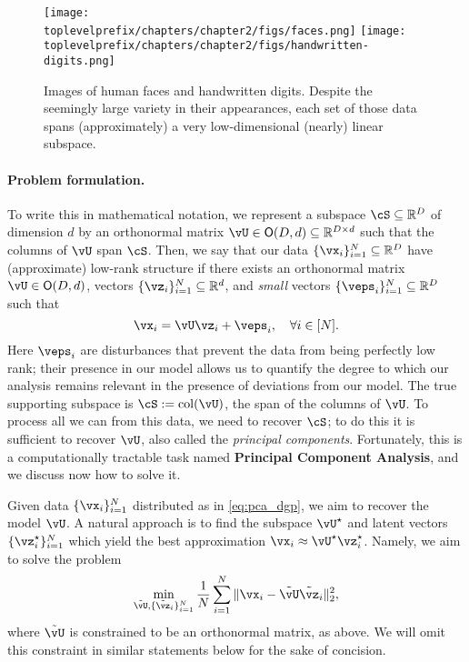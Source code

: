 \documentclass[\toplevelprefix/book-main.tex]{subfiles}
\begin{document}
\begin{figure}
    \centering
    \texttt{[image: \\toplevelprefix/chapters/chapter2/figs/faces.png]}
    \hspace{5mm} \texttt{[image: \\toplevelprefix/chapters/chapter2/figs/handwritten-digits.png]}   
    \caption{Images of human faces and handwritten digits. Despite the seemingly large variety in their appearances, each set of those data spans (approximately) a very low-dimensional (nearly) linear subspace.}
    \label{fig:faces-digits}
\end{figure}

\paragraph{Problem formulation.}
To write this in mathematical notation, we represent a subspace \(\cS \subseteq \R^{D}\) of dimension \(d\)  by an orthonormal matrix \(\vU \in \O(D, d) \subseteq \R^{D \times d}\) such that the columns of \(\vU\) span \(\cS\). Then, we say that our data \(\{\vx_{i}\}_{i = 1}^{N} \subseteq \R^{D}\) have (approximate) low-rank structure if there exists an orthonormal matrix \(\vU \in \O(D, d)\), vectors \(\{\vz_{i}\}_{i = 1}^{N} \subseteq \R^{d}\), and \textit{small} vectors \(\{\veps_{i}\}_{i = 1}^{N} \subseteq \R^{D}\) such that 
\begin{equation}\label{eq:pca_dgp}
    \vx_{i} = \vU\vz_{i} + \veps_{i}, \quad \forall i \in [N].
\end{equation}
Here \(\veps_{i}\) are disturbances that prevent the data from being perfectly
low rank; their presence in our model allows us to quantify the degree to which
our analysis remains relevant in the presence of deviations from our model. The
true supporting subspace is \(\cS := \mathop{\mathrm{col}}(\vU)\), the span of
the columns of $\vU$. To process all we can from
this data, we need to recover \(\cS\); to do this it is sufficient to recover
\(\vU\), also called the \textit{principal components}. Fortunately, this is
a computationally tractable task named {\bf Principal Component Analysis}, and
we discuss now how to solve it.

Given data \(\{\vx_{i}\}_{i = 1}^{N}\) distributed as in \eqref{eq:pca_dgp}, we
aim to recover the model \(\vU\). A natural approach is to find the subspace
\(\vU^{\star}\) and latent vectors \(\{\vz_{i}^{\star}\}_{i = 1}^{N}\) which
yield the best approximation \(\vx_{i} \approx \vU^{\star}\vz_{i}^{\star}\). Namely, we aim to solve the problem 
\begin{equation}\label{eq:pca_sparse_recovery_problem}
    \min_{\tilde{\vU}, \{\tilde{\vz}_{i}\}_{i = 1}^{N}}\frac{1}{N}\sum_{i = 1}^{N}\norm{\vx_{i} - \tilde{\vU}\tilde{\vz}_{i}}_{2}^{2},
\end{equation}
where $\tilde{\vU}$ is constrained to be an orthonormal matrix, as above. We will omit
this constraint in similar statements below for the sake of concision.
\end{document}
